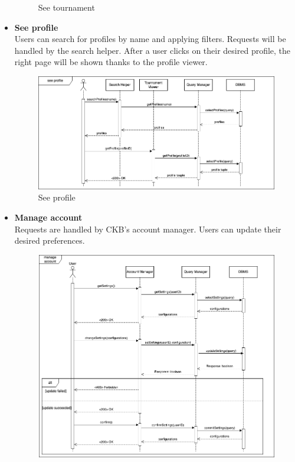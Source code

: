 \begin{itemize}
\begin{figure}[h]
        \caption{See tournament}
        \label{fig:See tournament}
    \end{figure}
    \vspace{1cm}
    \item \textbf{See profile}\\
    Users can search for profiles by name and applying filters. Requests will be handled by the search helper. After a user clicks on their desired profile, the right page 
    will be shown thanks to the profile viewer.
    \begin{figure}[h]
        \centering
        \includegraphics[width=1\linewidth]{src/See profile.png}
        \caption{See profile}
        \label{fig:See profile}
    \end{figure}
    \newpage
    \item \textbf{Manage account}\\
    Requests are handled by CKB's account manager. Users can update their desired preferences.
    \begin{figure}[h]
        \centering
        \includegraphics[width=1\linewidth]{src/Manage account.png}

\end{figure}
\end{itemize}
